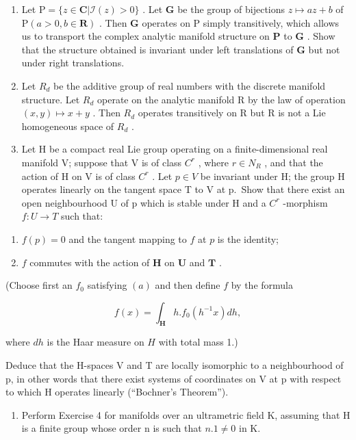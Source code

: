 \begin{enumerate}
\def\labelenumi{\arabic{enumi}.}
\setcounter{enumi}{1}
\item
  Let \(\mathrm{P} = \{z\in \mathbf{C}|\mathcal{I}(z) > 0\}\) . Let \(\mathbf{G}\) be the group of bijections \(z\mapsto az + b\) of \(\mathrm{P}(a > 0,b\in \mathbf{R})\) . Then \(\mathbf{G}\) operates on \(\mathrm{P}\) simply transitively, which allows us to transport the complex analytic manifold structure on \(\mathbf{P}\) to \(\mathbf{G}\) . Show that the structure obtained is invariant under left translations of \(\mathbf{G}\) but not under right translations.
\item
  Let \(R_{d}\) be the additive group of real numbers with the discrete manifold structure. Let \(R_{d}\) operate on the analytic manifold R by the law of operation \((x,y)\mapsto x+y\) . Then \(R_{d}\) operates transitively on R but R is not a Lie homogeneous space of \(R_{d}\) .
\item
  Let H be a compact real Lie group operating on a finite-dimensional real manifold V; suppose that V is of class \(C^{r}\) , where \(r \in N_{R}\) , and that the action of H on V is of class \(C^{r}\) . Let \(p \in V\) be invariant under H; the group H operates linearly on the tangent space T to V at p.~Show that there exist an open neighbourhood U of p which is stable under H and a \(C^{r}\) -morphism \(f: U \to T\) such that:
\end{enumerate}

\begin{enumerate}
\def\labelenumi{(\alph{enumi})}
\item
  \(f(p) = 0\) and the tangent mapping to \(f\) at \(p\) is the identity;
\item
  \(f\) commutes with the action of \(\mathbf{H}\) on \(\mathbf{U}\) and \(\mathbf{T}\) .
\end{enumerate}

(Choose first an \(f_0\) satisfying \((a)\) and then define \(f\) by the formula

\[
f (x) = \int_ {\mathbf {H}} h. f _ {0} (h ^ {- 1} x) d h,
\]

where \(dh\) is the Haar measure on \(H\) with total mass 1.)

Deduce that the H-spaces V and T are locally isomorphic to a neighbourhood of p, in other words that there exist systems of coordinates on V at p with respect to which H operates linearly (``Bochner's Theorem'').

\begin{enumerate}
\def\labelenumi{\arabic{enumi}.}
\setcounter{enumi}{4}
\tightlist
\item
  Perform Exercise 4 for manifolds over an ultrametric field K, assuming that H is a finite group whose order n is such that \(n.1 \neq 0\) in K.
\end{enumerate}

